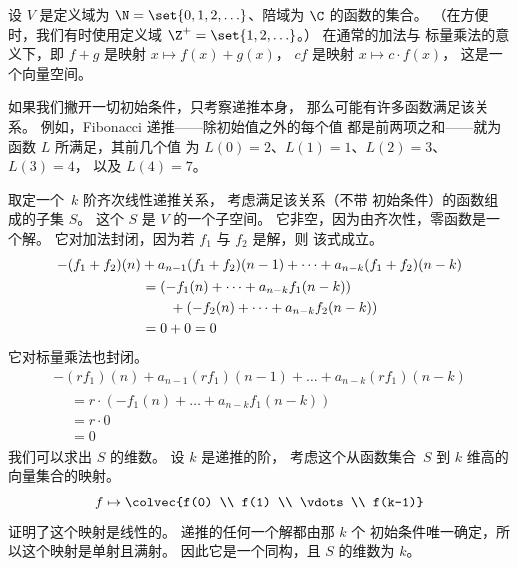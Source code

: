 设 $V$ 是定义域为
$\N=\set{0,1,2,\ldots}$、陪域为 $\C$ 的函数的集合。
（在方便时，我们有时使用定义域 $\Z^+=\set{1,2,\ldots}$。）
在通常的加法与
标量乘法的意义下，即
$f+g$ 是映射 $x\mapsto f(x)+g(x)$，
$cf$ 是映射 $x\mapsto c\cdot f(x)$，
这是一个向量空间。

如果我们撇开一切初始条件，只考察递推本身，
那么可能有许多函数满足该关系。
例如，Fibonacci 递推——除初始值之外的每个值
都是前两项之和——就为函数 $L$ 所满足，其前几个值
为 $L(0)=2$、$L(1)=1$、$L(2)=3$、$L(3)=4$，
以及 $L(4)=7$。

取定一个~$k$ 阶齐次线性递推关系，
考虑满足该关系（不带
初始条件）的函数组成的子集 $S$。
这个 $S$ 是 $V$ 的一个子空间。
它非空，因为由齐次性，零函数是一个解。
它对加法封闭，因为若 $f_1$ 与 $f_2$ 是解，则
该式成立。
\begin{multline*}
  -(f_1+f_2)(n)+a_{n-1}(f_1+f_2)(n-1)+\dots+a_{n-k}(f_1+f_2)(n-k) \\  
  \begin{aligned}
    &=(-f_1(n)+\dots+a_{n-k}f_1(n-k))          \\
    &\qquad\hbox{}+(-f_2(n)+\dots+a_{n-k}f_2(n-k))     \\
    &=0+0=0
  \end{aligned}
\end{multline*}
它对标量乘法也封闭。
\begin{multline*}
  -(rf_1)(n)+a_{n-1}(rf_1)(n-1)+\dots+a_{n-k}(rf_1)(n-k) \\  
  \begin{aligned}
    &=r\cdot (-f_1(n)+\dots+a_{n-k}f_1(n-k))   \\
    &=r\cdot 0                                    \\
    &=0
  \end{aligned}
\end{multline*}
我们可以求出 $S$ 的维数。
设 $k$ 是递推的阶，
考虑这个从函数集合~$S$ 到
$k$ 维高的向量集合的映射。
\begin{equation*}
  f 
  \mapsto 
  \colvec{f(0) \\ f(1) \\ \vdots \\ f(k-1)}
\end{equation*}
 证明了这个映射是线性的。
递推的任何一个解都由那 $k$ 个
初始条件唯一确定，所以这个映射是单射且满射。
因此它是一个同构，且 $S$ 的维数为 $k$。

